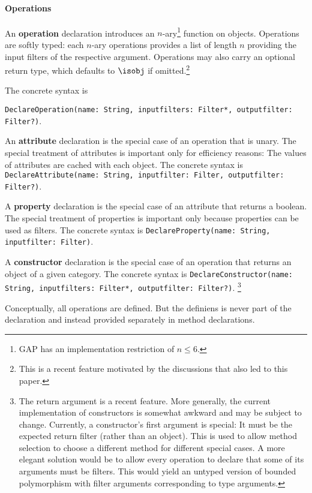 \paragraph{Operations}
An \textbf{operation} declaration introduces an $n$-ary\footnote{GAP has an implementation restriction of $n\leq 6$.} function on objects.
Operations are softly typed: each $n$-ary operations provides a list of length $n$ providing the input filters of the respective argument.
Operations may also carry an optional return type, which defaults to $\isobj$ if omitted.\footnote{This is a recent feature motivated by the discussions that also led to this paper.}

The concrete syntax is

 \lstinline|DeclareOperation(name: String, inputfilters: Filter*, outputfilter: Filter?)|.

An \textbf{attribute} declaration is the special case of an operation that is unary.
The special treatment of attributes is important only for efficiency reasons: The values of attributes are cached with each object.
The concrete syntax is \lstinline|DeclareAttribute(name: String, inputfilter: Filter, outputfilter: Filter?)|.

A \textbf{property} declaration is the special case of an attribute that returns a boolean.
The special treatment of properties is important only because properties can be used as filters.
The concrete syntax is \lstinline|DeclareProperty(name: String, inputfilter: Filter)|.

A \textbf{constructor} declaration is the special case of an operation that returns an object of a given category.
The concrete syntax is \lstinline|DeclareConstructor(name: String, inputfilters: Filter*, outputfilter: Filter?)|.%
\footnote{The return argument is a recent feature. More generally, the current implementation of constructors is somewhat awkward and may be subject to change. Currently, a constructor's first argument is special: It must be the expected return filter (rather than an object).
This is used to allow method selection to choose a different method for different special cases.
A more elegant solution would be to allow every operation to declare that some of its arguments must be filters.
This would yield an untyped version of bounded polymorphism with filter arguments corresponding to type arguments.}

Conceptually, all operations are defined.
But the definiens is never part of the declaration and instead provided separately in method declarations.

